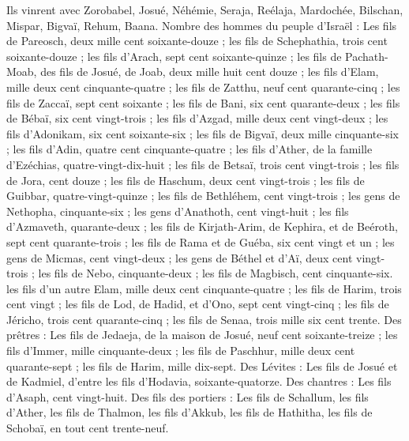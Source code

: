 \begin{multicols}{2}
Ils vinrent avec Zorobabel, Josué, Néhémie, Seraja, Reélaja, Mardochée, Bilschan, Mispar, Bigvaï, Rehum, Baana. Nombre des hommes du peuple d'Israël :
Les fils de Pareosch, deux mille cent soixante-douze ;
les fils de Schephathia, trois cent soixante-douze ;
les fils d'Arach, sept cent soixante-quinze ;
les fils de Pachath-Moab, des fils de Josué, de Joab, deux mille huit cent douze ;
les fils d'Elam, mille deux cent cinquante-quatre ;
les fils de Zatthu, neuf cent quarante-cinq ;
les fils de Zaccaï, sept cent soixante ;
les fils de Bani, six cent quarante-deux ;
les fils de Bébaï, six cent vingt-trois ;
les fils d'Azgad, mille deux cent vingt-deux ;
les fils d'Adonikam, six cent soixante-six ;
les fils de Bigvaï, deux mille cinquante-six ;
les fils d'Adin, quatre cent cinquante-quatre ;
les fils d'Ather, de la famille d'Ezéchias, quatre-vingt-dix-huit ;
les fils de Betsaï, trois cent vingt-trois ;
les fils de Jora, cent douze ;
les fils de Haschum, deux cent vingt-trois ;
les fils de Guibbar, quatre-vingt-quinze ;
les fils de Bethléhem, cent vingt-trois ;
les gens de Nethopha, cinquante-six ;
les gens d'Anathoth, cent vingt-huit ;
les fils d'Azmaveth, quarante-deux ;
les fils de Kirjath-Arim, de Kephira, et de Beéroth, sept cent quarante-trois ;
les fils de Rama et de Guéba, six cent vingt et un ;
les gens de Micmas, cent vingt-deux ;
les gens de Béthel et d'Aï, deux cent vingt-trois ;
les fils de Nebo, cinquante-deux ;
les fils de Magbisch, cent cinquante-six.
les fils d'un autre Elam, mille deux cent cinquante-quatre ;
les fils de Harim, trois cent vingt ;
les fils de Lod, de Hadid, et d'Ono, sept cent vingt-cinq ;
les fils de Jéricho, trois cent quarante-cinq ;
les fils de Senaa, trois mille six cent trente.
Des prêtres : Les fils de Jedaeja, de la maison de Josué, neuf cent soixante-treize ;
les fils d'Immer, mille cinquante-deux ;
les fils de Paschhur, mille deux cent quarante-sept ;
les fils de Harim, mille dix-sept.
Des Lévites : Les fils de Josué et de Kadmiel, d'entre les fils d'Hodavia, soixante-quatorze.
Des chantres : Les fils d'Asaph, cent vingt-huit.
Des fils des portiers : Les fils de Schallum, les fils d'Ather, les fils de Thalmon, les fils d'Akkub, les fils de Hathitha, les fils de Schobaï, en tout cent trente-neuf.

\end{multicols}
